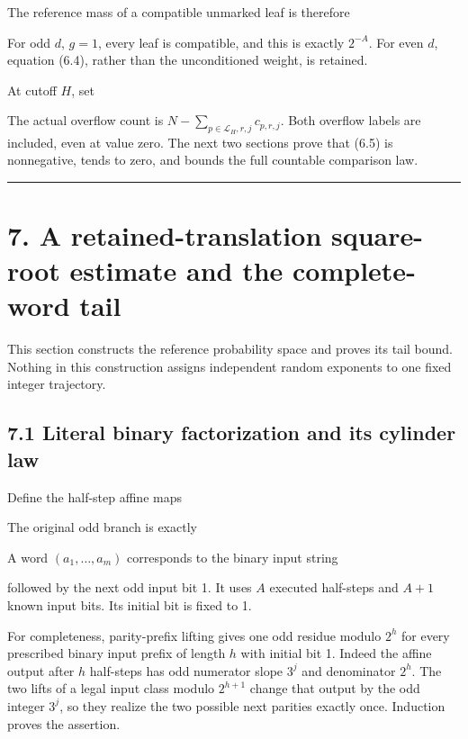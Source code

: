 The reference mass of a compatible unmarked leaf is therefore


For odd \(d\), \(g=1\), every leaf is compatible, and this is exactly
\(2^{-A}\). For even \(d\), equation (6.4), rather than the
unconditioned weight, is retained.

At cutoff \(H\), set


The actual overflow count is \(N-\sum_{p\in\mathcal L_H,r,j}c_{p,r,j}\).
Both overflow labels are included, even at value zero. The next two
sections prove that (6.5) is nonnegative, tends to zero, and bounds the
full countable comparison law.

\begin{center}\rule{0.5\linewidth}{0.5pt}\end{center}

\section{7. A retained-translation square-root estimate and the
complete-word tail}

This section constructs the reference probability space and proves its
tail bound. Nothing in this construction assigns independent random
exponents to one fixed integer trajectory.

\subsection{7.1 Literal binary factorization and its cylinder law}

Define the half-step affine maps


The original odd branch is exactly


A word \((a_1,\ldots,a_m)\) corresponds to the binary input string


followed by the next odd input bit 1. It uses \(A\) executed half-steps
and \(A+1\) known input bits. Its initial bit is fixed to 1.

For completeness, parity-prefix lifting gives one odd residue modulo
\(2^h\) for every prescribed binary input prefix of length \(h\) with
initial bit 1. Indeed the affine output after \(h\) half-steps has odd
numerator slope \(3^j\) and denominator \(2^h\). The two lifts of a
legal input class modulo \(2^{h+1}\) change that output by the odd
integer \(3^j\), so they realize the two possible next parities exactly
once. Induction proves the assertion.

